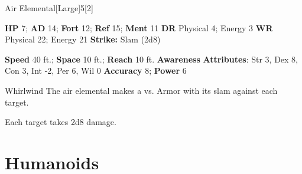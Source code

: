   \begin{monsection}{Air Elemental}[Large]{5}[2]
    \vspace{-1em}\vspace{-1em}
    \begin{spellcontent}
      \begin{spelltargetinginfo}
        \pari \textbf{HP} 7;
          \textbf{AD} 14;
          \textbf{Fort} 12;
          \textbf{Ref} 15;
          \textbf{Ment} 11
        \pari \textbf{DR} Physical 4; Energy 3
        \pari \textbf{WR} Physical 22; Energy 21
        \pari \textbf{Strike:}
            Slam  (2d8)
      \end{spelltargetinginfo}
    \end{spellcontent}
    \begin{monsterfooter}
      \pari \textbf{Speed} 40 ft.;
        \textbf{Space} 10 ft.;
        \textbf{Reach} 10 ft.
      \pari \textbf{Awareness} 
      \pari \textbf{Attributes}:
        Str 3, Dex 8, Con 3,
        Int -2, Per 6, Wil 0
      \pari \textbf{Accuracy} 8;
        \textbf{Power} 6
    \end{monsterfooter}
  \end{monsection}
  \begin{freeability}{Whirlwind}
      The air elemental makes a 
         vs. Armor
        with its slam against each target.
    
    \hit Each target takes 2d8  damage.
    \end{freeability}
  
        \section{Humanoids}
      
